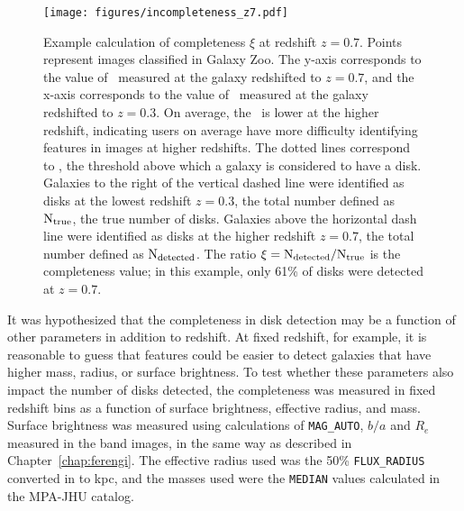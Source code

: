 \begin{figure}
\centering
\texttt{[image: figures/incompleteness\_z7.pdf]}
\caption{Example calculation of completeness $\xi$ at redshift $z=0.7$. Points represent  images classified in Galaxy Zoo. The y-axis corresponds to the value of \ffeatures~measured at the galaxy redshifted to $z=0.7$, and the x-axis corresponds to the value of \ffeatures~measured at the galaxy redshifted to $z=0.3$. On average, the \ffeatures~is lower at the higher redshift, indicating users on average have more difficulty identifying features in images at higher redshifts. The dotted lines correspond to , the threshold above which a galaxy is considered to have a disk. Galaxies to the right of the vertical dashed line were identified as disks at the lowest redshift $z=0.3$, the total number defined as $\rm N_{true}$, the true number of disks. Galaxies above the horizontal dash line were identified as disks at the higher redshift $z=0.7$, the total number defined as $\rm N_{detected}$. The ratio $\rm \xi=N_{detected}/N_{true}$ is the completeness value; in this example, only 61\% of disks were detected at $z=0.7$.}
\label{fig:inc_subplot}
\end{figure}

It was hypothesized that the completeness in disk detection may be a function of other parameters in addition to redshift. At fixed redshift, for example, it is reasonable to guess that features could be easier to detect galaxies that have higher mass, radius, or surface brightness. To test whether these parameters also impact the number of disks detected, the completeness was measured in fixed redshift bins as a function of surface brightness, effective radius, and mass. Surface brightness was measured using \sextractor{} calculations of {\tt MAG\_AUTO}, $b/a$ and $R_{e}$ measured in the \Iband{} band images, in the same way as described in Chapter~\ref{chap:ferengi}. The effective radius used was the 50\% {\tt FLUX\_RADIUS} converted in to kpc, and the masses used were the {\tt MEDIAN} values calculated in the MPA-JHU catalog.

